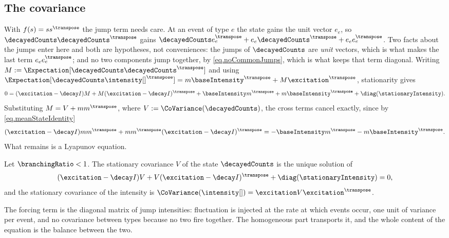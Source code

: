 \subsection{The covariance}

With $f(s) = ss^{\transpose}$ the jump term needs care.
At an event of type $e$ the state gains the unit vector $e_e$,
so $\decayedCounts \decayedCounts^{\transpose}$ gains
$\decayedCounts e_e^{\transpose} + e_e \decayedCounts^{\transpose} + e_e e_e^{\transpose}$.
Two facts about the jumps enter here and both are hypotheses, not conveniences:
the jumps of $\decayedCounts$ are \emph{unit} vectors,
which is what makes the last term $e_e e_e^{\transpose}$;
and no two components jump together, by \eqref{eq.noCommonJumps},
which is what keeps that term diagonal.
Writing $M := \Expectation[\decayedCounts\decayedCounts^{\transpose}]$ and using
$\Expectation[\decayedCounts \intensity[ ]^{\transpose}]
= m\baseIntensity^{\transpose} + M\excitation^{\transpose}$,
stationarity gives
\begin{equation*}
 0 = (\excitation - \decay I) M + M (\excitation - \decay I)^{\transpose}
 + \baseIntensity m^{\transpose} + m \baseIntensity^{\transpose}
 + \diag(\stationaryIntensity).
\end{equation*}
Substituting $M = V + m m^{\transpose}$, where $V := \CoVariance(\decayedCounts)$,
the cross terms cancel exactly, since by \eqref{eq.meanStateIdentity}
\begin{equation*}
 (\excitation - \decay I) m m^{\transpose} + m m^{\transpose}(\excitation - \decay I)^{\transpose}
 = -\baseIntensity m^{\transpose} - m\baseIntensity^{\transpose} .
\end{equation*}
What remains is a Lyapunov equation.

\begin{prop}\label{prop.lyapunov}
 Let $\branchingRatio < 1$.
 The stationary covariance $V$ of the state $\decayedCounts$ is the unique solution of
 \begin{equation}\label{eq.lyapunov}
  (\excitation - \decay I) V + V (\excitation - \decay I)^{\transpose}
  + \diag(\stationaryIntensity) = 0 ,
 \end{equation}
 and the stationary covariance of the intensity is
 $\CoVariance(\intensity[ ]) = \excitation V \excitation^{\transpose}$.
\end{prop}

The forcing term is the diagonal matrix of jump intensities:
fluctuation is injected at the rate at which events occur,
one unit of variance per event, and no covariance between types because no two fire together.
The homogeneous part transports it,
and the whole content of the equation is the balance between the two.

